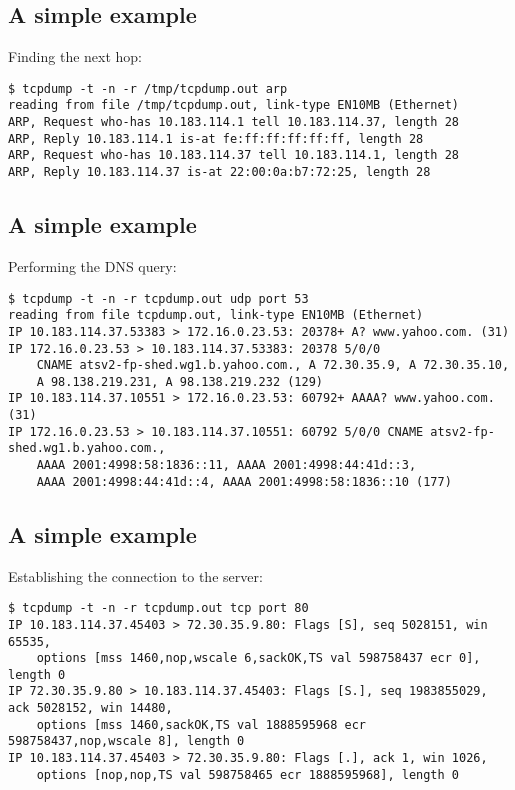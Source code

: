 \documentclass[xga]{xdvislides}
\begin{document}
\subsection{A simple example}
Finding the next hop:
\begin{verbatim}
$ tcpdump -t -n -r /tmp/tcpdump.out arp
reading from file /tmp/tcpdump.out, link-type EN10MB (Ethernet)
ARP, Request who-has 10.183.114.1 tell 10.183.114.37, length 28
ARP, Reply 10.183.114.1 is-at fe:ff:ff:ff:ff:ff, length 28
ARP, Request who-has 10.183.114.37 tell 10.183.114.1, length 28
ARP, Reply 10.183.114.37 is-at 22:00:0a:b7:72:25, length 28
\end{verbatim}
\vspace{.5in}

\subsection{A simple example}
Performing the DNS query:
\begin{verbatim}
$ tcpdump -t -n -r tcpdump.out udp port 53
reading from file tcpdump.out, link-type EN10MB (Ethernet)
IP 10.183.114.37.53383 > 172.16.0.23.53: 20378+ A? www.yahoo.com. (31)
IP 172.16.0.23.53 > 10.183.114.37.53383: 20378 5/0/0
	CNAME atsv2-fp-shed.wg1.b.yahoo.com., A 72.30.35.9, A 72.30.35.10,
	A 98.138.219.231, A 98.138.219.232 (129)
IP 10.183.114.37.10551 > 172.16.0.23.53: 60792+ AAAA? www.yahoo.com. (31)
IP 172.16.0.23.53 > 10.183.114.37.10551: 60792 5/0/0 CNAME atsv2-fp-shed.wg1.b.yahoo.com.,
	AAAA 2001:4998:58:1836::11, AAAA 2001:4998:44:41d::3,
	AAAA 2001:4998:44:41d::4, AAAA 2001:4998:58:1836::10 (177)
\end{verbatim}

\subsection{A simple example}
Establishing the connection to the server:
\begin{verbatim}
$ tcpdump -t -n -r tcpdump.out tcp port 80
IP 10.183.114.37.45403 > 72.30.35.9.80: Flags [S], seq 5028151, win 65535,
	options [mss 1460,nop,wscale 6,sackOK,TS val 598758437 ecr 0], length 0
IP 72.30.35.9.80 > 10.183.114.37.45403: Flags [S.], seq 1983855029, ack 5028152, win 14480,
	options [mss 1460,sackOK,TS val 1888595968 ecr 598758437,nop,wscale 8], length 0
IP 10.183.114.37.45403 > 72.30.35.9.80: Flags [.], ack 1, win 1026,
	options [nop,nop,TS val 598758465 ecr 1888595968], length 0
\end{verbatim}
\end{document}
